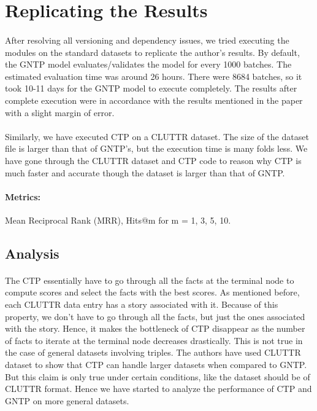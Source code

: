 \documentclass[Other]{iitddiss}
\begin{document}
\section{Replicating the Results}
\paragraph{}
After resolving all versioning and dependency issues, we tried executing the modules on the standard datasets to replicate the author's results. By default, the GNTP model evaluates/validates the model for every 1000 batches. The estimated evaluation time was around 26 hours. There were 8684 batches, so it took 10-11 days for the GNTP model to execute completely. The results after complete execution were in accordance with the results mentioned in the paper with a slight margin of error. 

\paragraph{}
Similarly, we have executed CTP on a CLUTTR dataset. The size of the dataset file is larger than that of GNTP's, but the execution time is many folds less. We have gone through the CLUTTR dataset and CTP code to reason why CTP is much faster and accurate though the dataset is larger than that of GNTP.

\paragraph{Metrics:}
Mean Reciprocal Rank (MRR), Hits@m for m = 1, 3, 5, 10.

\subsection{Analysis}
\paragraph{}
The CTP essentially have to go through all the facts at the terminal node to compute scores and select the facts with the best scores. As mentioned before, each CLUTTR data entry has a story associated with it. Because of this property, we don't have to go through all the facts, but just the ones associated with the story. Hence, it makes the bottleneck of CTP disappear as the number of facts to iterate at the terminal node decreases drastically. This is not true in the case of general datasets involving triples. The authors have used CLUTTR dataset to show that CTP can handle larger datasets when compared to GNTP. But this claim is only true under certain conditions, like the dataset should be of CLUTTR format. Hence we have started to analyze the performance of CTP and GNTP on more general datasets.
\end{document}
